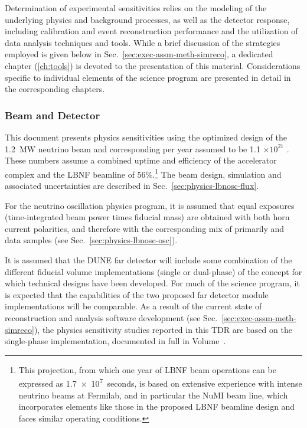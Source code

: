 Determination of experimental sensitivities relies on the
modeling of the underlying physics and background processes,
as well as the detector response, including calibration and
event reconstruction performance and the utilization of data
analysis techniques and tools.
While a brief discussion of the strategies employed is given below
in Sec.~\ref{sec:exec-assm-meth-simreco}, a dedicated chapter
(\ref{ch:tools}) is devoted to the presentation of this material.
Considerations specific to individual elements of the science
program are presented in detail in the corresponding chapters.

\subsubsection{Beam and Detector}
\label{sec:exec-assm-meth-beamdetector}

This document presents physics sensitivities using
the optimized design of the 1.2~MW neutrino beam and
corresponding  per year assumed to
be 1.1 $\times 10^{21}$ .  These numbers assume a combined
uptime and efficiency of the \fnal accelerator complex and the
LBNF beamline of 56\%.\footnote{This projection, from which one  
year of LBNF beam operations can be expressed as \SI{1.7e7}{seconds}, 
is based on extensive 
experience with intense neutrino beams at Fermilab, and in particular 
the NuMI beam line, which incorporates elements like those in the  
proposed LBNF beamline design and faces similar operating conditions.} 
The beam design, simulation and associated
uncertainties are described in
Sec.~\ref{sec:physics-lbnosc-flux}.

For the neutrino oscillation physics program, it is assumed that
equal exposures (time-integrated beam power times fiducial mass) are obtained with both horn current polarities,
and therefore with the corresponding mix of primarily \numu
and \anumu data samples (see Sec.~\ref{sec:physics-lbnosc-osc}).

It is assumed that the DUNE far detector will include some
combination of the different \nominalmodsize fiducial volume
implementations (single or dual-phase) of the \lartpc concept
for which technical designs have been developed.
For much of the science program, it is expected that the
capabilities of the two proposed far detector module 
implementations will be comparable.  As a result of the
current state of reconstruction and analysis software development
(see Sec.~\ref{sec:exec-assm-meth-simreco}), the
physics sensitivity studies reported in this TDR are based on
the single-phase \lartpc implementation,
documented in full in Volume~\volnumbersp{}.


